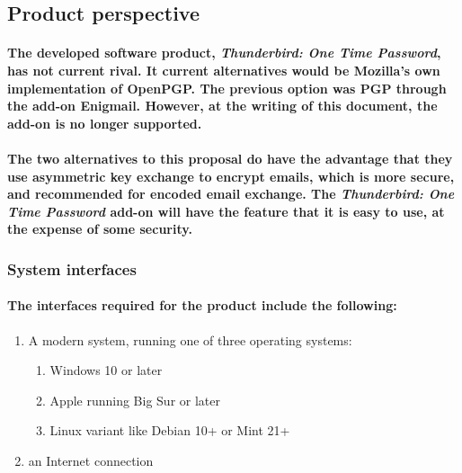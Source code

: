 \subsection{Product perspective}
%
%
\paragraph{The developed software product, \emph{Thunderbird: One Time Password}, has not current rival. It current alternatives would be Mozilla's own implementation of OpenPGP. The previous option was PGP through the add-on Enigmail. However, at the writing of this document, the add-on is no longer supported.}
\paragraph{The two alternatives to this proposal do have the advantage that they use asymmetric key exchange to encrypt emails, which is more secure, and recommended for encoded email exchange. The \emph{Thunderbird: One Time Password} add-on will have the feature that it is easy to use, at the expense of some security.}


\subsubsection{System interfaces}
\paragraph{The interfaces required for the product include the following:}
\begin{enumerate}
\item A modern system, running one of three operating systems:
\begin{enumerate}
\item Windows 10 or later
\item Apple running Big Sur or later
\item Linux variant like Debian 10+ or Mint 21+
\end{enumerate}
\item an Internet connection
\end{enumerate}


